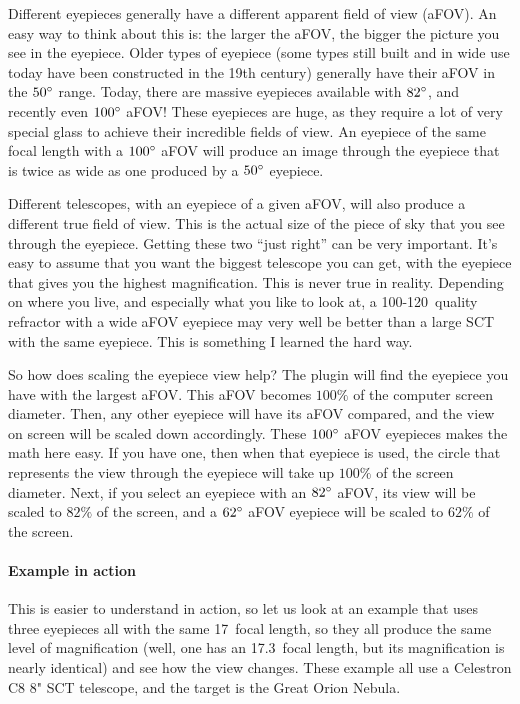Different eyepieces generally have a different apparent field of view (aFOV). An easy way to think about this is: the larger the aFOV, the bigger the picture you see in the eyepiece. 
Older types of eyepiece (some types still built and in wide use today have been constructed in the 19th century) generally have their aFOV in the $50\degree$ range. 
Today, there are massive eyepieces available with $82\degree$, and recently even $100\degree$ aFOV! 
These eyepieces are huge, as they require a lot of very special glass to achieve their incredible fields of view. 
An eyepiece of the same focal length with a $100\degree$ aFOV will produce an image through the eyepiece that is twice as wide as one produced by a $50\degree$ eyepiece.

Different telescopes, with an eyepiece of a given aFOV, will also produce a different true field of view. 
This is the actual size of the piece of sky that you see through the eyepiece. 
Getting these two ``just right'' can be very important. 
It's easy to assume that you want the biggest telescope you can get, with the eyepiece that gives you the highest magnification. 
This is never true in reality. Depending on where you live, and especially what you like to look at, a 100-120\mm\ quality refractor with a wide aFOV eyepiece may very well be better than a large SCT with the same eyepiece. This is something I learned the hard way.

So how does scaling the eyepiece view help? The plugin will find the eyepiece you have with the largest aFOV. This aFOV becomes $100\%$ of the computer screen diameter. 
Then, any other eyepiece will have its aFOV compared, and the view on screen will be scaled down accordingly. These $100\degree$ aFOV eyepieces makes the math here easy. If you have one, then when that eyepiece is used, the circle that represents the view through the eyepiece will take up $100\%$ of the screen diameter. Next, if you select an eyepiece with an $82\degree$ aFOV, its view will be scaled to $82\%$ of the screen, and a $62\degree$ aFOV eyepiece will be scaled to $62\%$ of the screen.

\paragraph{Example in action}

This is easier to understand in action, so let us look at an example that uses three eyepieces all with the same 17\mm\ focal length, 
so they all produce the same level of magnification (well, one has an 17.3\mm\ focal length, but its magnification is nearly identical) and see how the view changes.
These example all use a Celestron C8 8" SCT telescope, and the target is the Great Orion Nebula.

